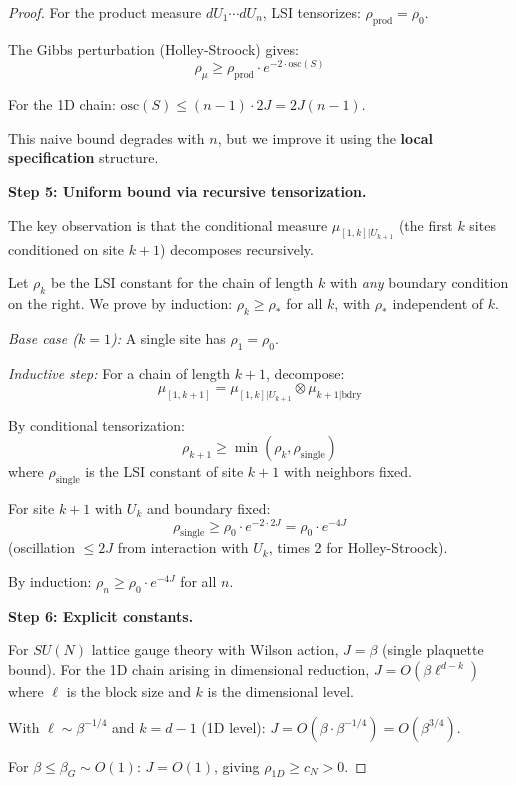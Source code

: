 \begin{proof}
For the product measure $dU_1 \cdots dU_n$, LSI tensorizes: $\rho_{\mathrm{prod}} = \rho_0$.

The Gibbs perturbation (Holley-Stroock) gives:
\[
\rho_{\mu} \geq \rho_{\mathrm{prod}} \cdot e^{-2 \cdot \mathrm{osc}(S)}
\]

For the 1D chain: $\mathrm{osc}(S) \leq (n-1) \cdot 2J = 2J(n-1)$.

This naive bound degrades with $n$, but we improve it using the \textbf{local 
specification} structure.

\textbf{Step 5: Uniform bound via recursive tensorization.}

The key observation is that the conditional measure $\mu_{[1,k]|U_{k+1}}$ (the 
first $k$ sites conditioned on site $k+1$) decomposes recursively.

Let $\rho_k$ be the LSI constant for the chain of length $k$ with \emph{any} 
boundary condition on the right. We prove by induction: $\rho_k \geq \rho_*$ 
for all $k$, with $\rho_*$ independent of $k$.

\textit{Base case ($k=1$):} A single site has $\rho_1 = \rho_0$.

\textit{Inductive step:} For a chain of length $k+1$, decompose:
\[
\mu_{[1,k+1]} = \mu_{[1,k]|U_{k+1}} \otimes \mu_{k+1|\mathrm{bdry}}
\]

By conditional tensorization:
\[
\rho_{k+1} \geq \min(\rho_k, \rho_{\mathrm{single}})
\]
where $\rho_{\mathrm{single}}$ is the LSI constant of site $k+1$ with neighbors fixed.

For site $k+1$ with $U_k$ and boundary fixed:
\[
\rho_{\mathrm{single}} \geq \rho_0 \cdot e^{-2 \cdot 2J} = \rho_0 \cdot e^{-4J}
\]
(oscillation $\leq 2J$ from interaction with $U_k$, times 2 for Holley-Stroock).

By induction: $\rho_n \geq \rho_0 \cdot e^{-4J}$ for all $n$.

\textbf{Step 6: Explicit constants.}

For $SU(N)$ lattice gauge theory with Wilson action, $J = \beta$ (single plaquette bound).
For the 1D chain arising in dimensional reduction, $J = O(\beta \ell^{d-k})$ where 
$\ell$ is the block size and $k$ is the dimensional level.

With $\ell \sim \beta^{-1/4}$ and $k = d-1$ (1D level): $J = O(\beta \cdot \beta^{-1/4}) = O(\beta^{3/4})$.

For $\beta \leq \beta_G \sim O(1)$: $J = O(1)$, giving $\rho_{1D} \geq c_N > 0$.
\end{proof}

